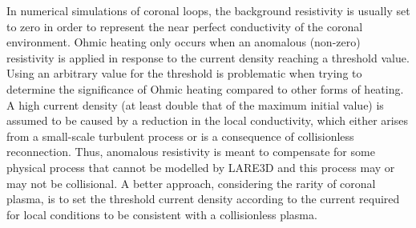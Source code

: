 \documentclass{./packages/rs/rsproca}
\begin{document}
In numerical simulations of coronal loops, the background resistivity is usually set to zero in order to represent the near perfect conductivity of the coronal environment. Ohmic heating only occurs when an anomalous (non-zero) resistivity is applied in response to the current density reaching a threshold value. Using an arbitrary value for the threshold is problematic when trying to determine the significance of Ohmic heating compared to other forms of heating. A high current density (at least double that of the maximum initial value) is assumed to be caused by a reduction in the local conductivity, which either arises from a small-scale turbulent process or is a consequence of collisionless reconnection. Thus, anomalous resistivity is meant to compensate for some physical process that cannot be modelled by LARE3D and this process may or may not be collisional. A better approach, considering the rarity of coronal plasma, is to set the threshold current density according to the current required for local conditions to be consistent with a collisionless plasma. 
\end{document}
